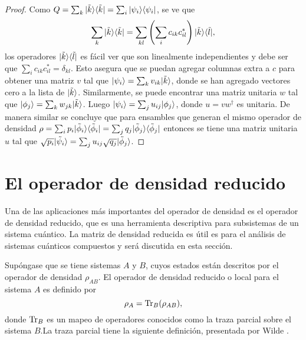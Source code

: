 \begin{proof}
Como  $Q=\sum_k  |\tilde{k}\rangle \langle \tilde{k}|=\sum_{i}|\psi_i\rangle \langle\psi_i|$, se ve
que \[\sum_k |\tilde{k}\rangle \langle \tilde{k}|=\sum_{kl} \left(\sum_i
c_{ik}c_{il}^{*}\right)|\tilde{k}\rangle \langle \tilde{l}|,\] los operadores $|\tilde{k}
\rangle \langle \tilde{l}|$ es fácil ver  que son linealmente independientes y debe ser
que $\sum_i c_{ik}c_{il}^{*}=\delta_{kl}$. Esto asegura que se puedan agregar
columnas extra a $c$ para obtener una matriz $v$ tal que
$|\psi_i\rangle=\sum_{k}v_{ik}|\tilde{k}\rangle  $, donde se han agregado  vectores cero a la
lista de $|\tilde{k}\rangle$. Similarmente, se puede encontrar una matriz unitaria
$w$ tal que $|\phi_j\rangle=\sum_{k}w_{jk}|\tilde{k}\rangle$. Luego $|\psi_i\rangle=\sum_j
u_{ij}|\phi_j\rangle$, donde  $u=vw^\dagger$ es unitaria. De manera similar se concluye que para ensambles que generan el mismo operador de densidad $\rho=\sum_i p_i |\tilde{\phi}_i\rangle \langle\tilde{\phi}_i|= \sum_j q_j|\tilde{\phi}_j \rangle \langle\tilde{\phi}_j| $ entonces se tiene una matriz unitaria $u$ tal que  $\sqrt{p_i}|\tilde{\psi}_i\rangle=\sum_{j} u_{ij} \sqrt{q_j}|\tilde{\phi}_j\rangle$.
\end{proof}

\section{El operador de densidad reducido} %

Una de las aplicaciones más importantes del operador de densidad es el operador
de densidad reducido, que es una herramienta descriptiva para subsistemas de un
sistema cuántico. La matriz de densidad reducida es útil es
para el análisis de sistemas cuánticos compuestos y será discutida
en esta sección.


Supóngase que se tiene sistemas $A$ y $B$, cuyos estados están descritos por el
operador de densidad $\rho_{AB}$. El operador de densidad reducido o local para
el sistema $A$ es definido por  
\begin{equation}
	\rho_A={\rm Tr}_B(\rho_{AB}),
\end{equation} 
donde ${\rm Tr}_B$ es un mapeo de operadores conocidos como la traza parcial sobre
el sistema $B$.La traza parcial tiene la siguiente definición, presentada
por Wilde {\cite{wilde2011classical}}.

